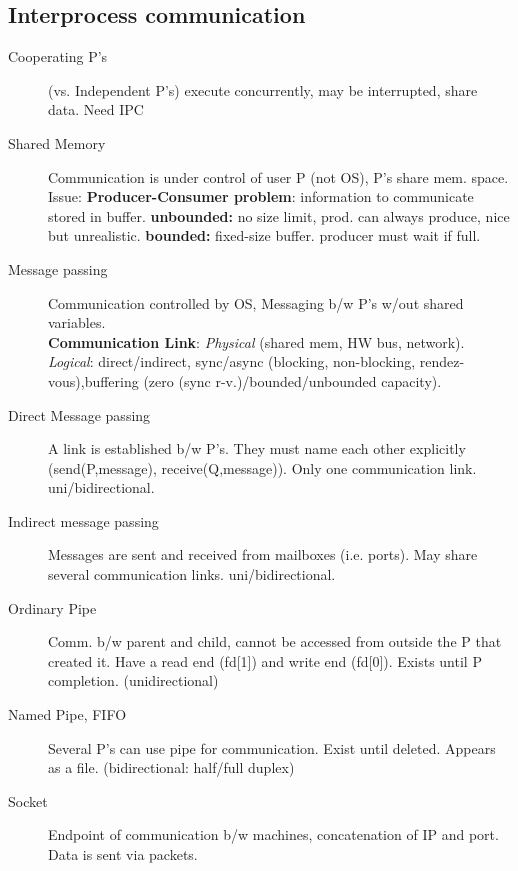 \subsection*{Interprocess communication}
\begin{description}
    \item[Cooperating P's](vs. Independent P's) execute concurrently, may be interrupted, share data. Need IPC
    \item[Shared Memory]Communication is under control of user P (not OS), P's share mem. space. Issue: \textbf{Producer-Consumer problem}: information to communicate stored in buffer. \textbf{unbounded:} no size limit, prod. can always produce, nice but unrealistic. \textbf{bounded:} fixed-size buffer. producer must wait if full.
  \item[Message passing] Communication controlled by OS, Messaging b/w P's w/out shared variables.\\
    \textbf{Communication Link}: \textit{Physical} (shared mem, HW bus, network). \textit{Logical}: direct/indirect, sync/async (blocking, non-blocking, rendez-vous),buffering (zero (sync r-v.)/bounded/unbounded capacity).
  \item[Direct Message passing] A link is established b/w P's. They must name each other explicitly (send(P,message), receive(Q,message)). Only one communication link. uni/bidirectional.
  \item[Indirect message passing] Messages are sent and received from mailboxes (i.e. ports). May share several communication links. uni/bidirectional.
  \item[Ordinary Pipe] Comm. b/w parent and child, cannot be accessed from outside the P that created it. Have a read end (fd[1]) and write end (fd[0]). Exists until P completion. (unidirectional)
  \item[Named Pipe, FIFO] Several P's can use pipe for communication. Exist until deleted. Appears as a file. (bidirectional: half/full duplex) %
  \item[Socket] Endpoint of communication b/w machines, concatenation of IP and port. Data is sent via packets.
\end{description}
